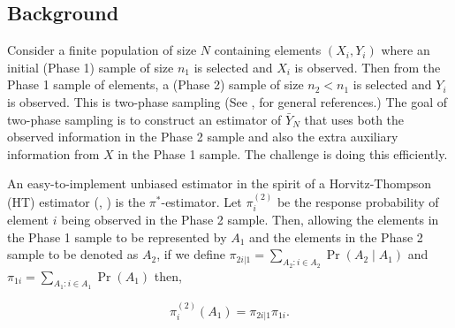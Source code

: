 \documentclass[12pt]{article}
\begin{document}
\subsection{Background}

Consider a finite population of size $N$ containing elements $(X_i, Y_i)$ where
an initial (Phase 1) sample of size $n_1$ is selected and $X_i$ is observed. Then
from the Phase 1 sample of elements, a (Phase 2) sample of size $n_2 < n_1$ is
selected and $Y_i$ is observed. This is two-phase sampling (See 
\cite{fuller2009sampling}, \cite{kim2024statistics} for general references.) The
goal of two-phase sampling is to construct an estimator of $\bar Y_N$ 
that uses both the observed information in the Phase 2 sample and also the extra
auxiliary information from $X$ in the Phase 1 sample.
The challenge is doing this efficiently.

An easy-to-implement unbiased estimator in the spirit of a Horvitz-Thompson (HT)
estimator (\cite{horvitz1952generalization}, \cite{narain1951sampling}) is the
$\pi^*$-estimator. Let $\pi_i^{(2)}$ be the response probability of element $i$
being observed in the Phase 2 sample. Then, allowing the elements in the Phase 1
sample to be represented by $A_1$ and the elements in the Phase 2 sample to be
denoted as $A_2$,
if we define $\pi_{2i | 1} = \sum_{A_2: i \in A_2} \Pr(A_2 \mid A_1)$ and
$\pi_{1i} = \sum_{A_1: i \in A_1} \Pr(A_1)$ then,

$$ \pi_i^{(2)}(A_1) = \pi_{2i | 1} \pi_{1i}.$$

\end{document}
